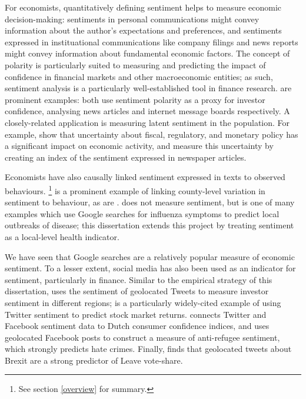 \documentclass{article}
\begin{document}
For economists, quantitatively defining sentiment helps to measure economic decision-making: sentiments in personal communications might convey information about the author's expectations and preferences, and sentiments expressed in instituational communications like company filings and news reports might convey information about fundamental economic factors. The concept of polarity is particularly suited to measuring and predicting the impact of confidence in financial markets and other macroeconomic entities; as such, sentiment analysis is a particularly well-established tool in finance research. \textcite{tetlockGivingContentInvestor2007a,antweilerAllThatTalk2004} are prominent examples: both use sentiment polarity as a proxy for investor confidence, analysing news articles and internet message boards respectively. A closely-related application is measuring latent sentiment in the population. For example, \textcite{bakerMeasuringEconomicPolicy2016} show that uncertainty about fiscal, regulatory, and monetary policy has a significant impact on economic activity, and measure this uncertainty by creating an index of the sentiment expressed in newspaper articles. 

Economists have also causally linked sentiment expressed in texts to observed behaviours. \textcite{stephens-davidowitzCostRacialAnimus2014}\footnote{See section \ref{overview} for summary.} is a prominent example of linking county-level variation in sentiment to behaviour, as are \textcite{choiPredictingPresentGoogle2012,saizProxyingUnobservableVariables2013}. \textcite{ginsbergDetectingInfluenzaEpidemics2009} does not measure sentiment, but is one of many examples which use Google searches for influenza symptoms to predict local outbreaks of disease; this dissertation extends this project by treating sentiment as a local-level health indicator. 

We have seen that Google searches are a relatively popular measure of economic sentiment. To a lesser extent, social media has also been used as an indicator for sentiment, particularly in finance. Similar to the empirical strategy of this dissertation, \textcite{affusoSocialMediaSentiment2019} uses the sentiment of geolocated Tweets to measure investor sentiment in different regions; \textcite{bollenTwitterMoodPredicts2011} is a particularly widely-cited example of using Twitter sentiment to predict stock market returns. \textcite{daasSocialMediaSentiment2014} connects Twitter and Facebook sentiment data to Dutch consumer confidence indices, and \textcite{mullerFanningFlamesHate2020} uses geolocated Facebook posts to construct a measure of anti-refugee sentiment, which strongly predicts hate crimes. Finally, \textcite{gorodnichenkoSocialMediaSentiment2018} finds that geolocated tweets about Brexit are a strong predictor of Leave vote-share.
\end{document}
